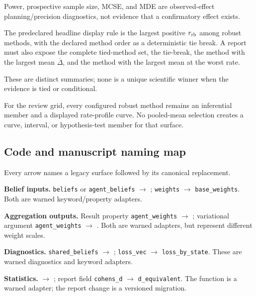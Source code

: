 \documentclass[
  english,
]{article}
\newcounter{none} %
\theoremstyle{plain}
\theoremstyle{definition}
\theoremstyle{remark}
\theoremstyle{definition}
\begin{document}
Power, prospective sample size, MCSE, and MDE are observed-effect
planning/precision diagnostics, not evidence that a confirmatory effect
exists.

The predeclared headline display rule is the largest positive
\(r_{\rm rb}\) among robust methods, with the declared method order as a
deterministic tie break. A report must also expose the complete
tied-method set, the tie-break, the method with the largest mean
\(\overline{\Delta}\), and the method with the largest mean at the worst
rate.

These are distinct summaries; none is a unique scientific winner when
the evidence is tied or conditional.

For the review grid, every configured robust method remains an
inferential member and a displayed rate-profile curve. No pooled-mean
selection creates a curve, interval, or hypothesis-test member for that
surface.

\subsection{Code and manuscript naming
map}\label{code-and-manuscript-naming-map}

Every arrow names a legacy surface followed by its canonical
replacement.

\textbf{Belief inputs.} \texttt{beliefs} or \texttt{agent\_beliefs} \texorpdfstring{\ensuremath{\to}}{->}
; \texttt{weights} \texorpdfstring{\ensuremath{\to}}{->} \texttt{base\_weights}.
Both are warned keyword/property adapters.

\textbf{Aggregation outputs.} Result property \texttt{agent\_weights} \texorpdfstring{\ensuremath{\to}}{->}
; variational argument
\texttt{agent\_weights} \texorpdfstring{\ensuremath{\to}}{->} . Both are
warned adapters, but represent different weight scales.

\textbf{Diagnostics.} \texttt{shared\_beliefs} \texorpdfstring{\ensuremath{\to}}{->}
; \texttt{loss\_vec} \texorpdfstring{\ensuremath{\to}}{->}
\texttt{loss\_by\_state}. These are warned diagnostics and keyword
adapters.

\textbf{Statistics.}  \texorpdfstring{\ensuremath{\to}}{->}
; report field
\texttt{cohens\_d} \texorpdfstring{\ensuremath{\to}}{->} \texttt{d\_equivalent}. The function is a warned
adapter; the report change is a versioned migration.
\end{document}
